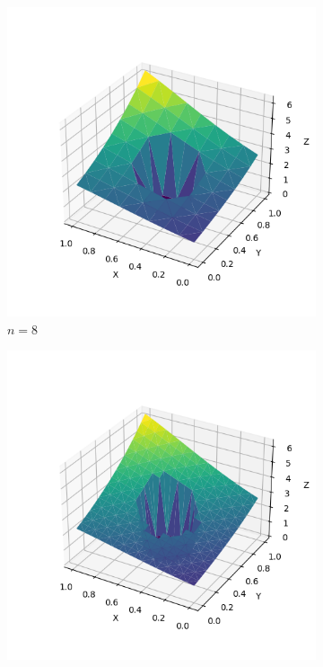 \documentclass[lang=cn,a4paper,newtx,bibend=bibtex]{elegantpaper}
\begin{document}
\begin{figure}[H]
  \centering
  \begin{subfigure}[b]{0.18\textwidth}
      \includegraphics[width=\textwidth]{../../res_bac/res-[data|1-Neumann-irregular-a8].png}
      \caption{$n =  8$}
  \end{subfigure}
  \hfill
  \begin{subfigure}[b]{0.18\textwidth}
      \includegraphics[width=\textwidth]{../../res_bac/res-[data|1-Neumann-irregular-b16].png}

\end{subfigure}
\end{figure}
\end{document}
